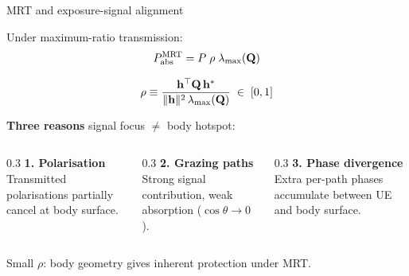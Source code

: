 \begin{frame}{MRT and exposure-signal alignment}

  Under maximum-ratio transmission:
  \[
    P_{\mathrm{abs}}^{\mathrm{MRT}} = P \;\rho\; \lambda_{\max}(\mathbf{Q})
  \]

  \begin{resultbox}
    \vspace{-6pt}
    \[
      \rho \equiv \frac{\mathbf{h}^\top \mathbf{Q}\, \mathbf{h}^*}{\|\mathbf{h}\|^2 \,\lambda_{\max}(\mathbf{Q})}
      \;\in\; [0,1]
    \]
  \end{resultbox}

  \vspace{4pt}
  \textbf{Three reasons} signal focus $\neq$ body hotspot:

  \begin{columns}[T]
    \begin{column}{0.3\textwidth}
      {\small \textbf{1. Polarisation}\\
       Transmitted polarisations partially cancel at body surface.}
    \end{column}

    \begin{column}{0.3\textwidth}
      {\small \textbf{2. Grazing paths}\\
       Strong signal contribution, weak absorption ($\cos\theta \to 0$).}
    \end{column}

    \begin{column}{0.3\textwidth}
      {\small \textbf{3. Phase divergence}\\
       Extra per-path phases accumulate between UE and body surface.}
    \end{column}
  \end{columns}

  \vspace{6pt}
  {\footnotesize Small $\rho$: body geometry gives inherent protection under MRT.}
\end{frame}

